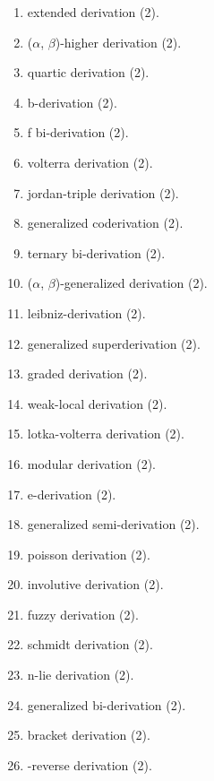 \begin{enumerate}
\item \allowbreak extended derivation \hfill(2).
\item \allowbreak ($\alpha$, $\beta$)-higher derivation \hfill(2).
\item \allowbreak quartic derivation \hfill(2).
\item \allowbreak b-derivation \hfill(2).
\item \allowbreak f bi-derivation \hfill(2).
\item \allowbreak volterra derivation \hfill(2).
\item \allowbreak jordan-triple derivation \hfill(2).
\item \allowbreak generalized coderivation \hfill(2).
\item \allowbreak ternary bi-derivation \hfill(2).
\item \allowbreak ($\alpha$, $\beta$)-generalized derivation \hfill(2).
\item \allowbreak leibniz-derivation \hfill(2).
\item \allowbreak generalized superderivation \hfill(2).
\item \allowbreak graded derivation \hfill(2).
\item \allowbreak weak-local derivation \hfill(2).
\item \allowbreak lotka-volterra derivation \hfill(2).
\item \allowbreak modular derivation \hfill(2).
\item \allowbreak e-derivation \hfill(2).
\item \allowbreak generalized semi-derivation \hfill(2).
\item \allowbreak poisson derivation \hfill(2).
\item \allowbreak involutive derivation \hfill(2).
\item \allowbreak fuzzy derivation \hfill(2).
\item \allowbreak schmidt derivation \hfill(2).
\item \allowbreak n-lie derivation \hfill(2).
\item \allowbreak generalized bi-derivation \hfill(2).
\item \allowbreak bracket derivation \hfill(2).
\item \allowbreak *-reverse derivation \hfill(2).
\end{enumerate}

